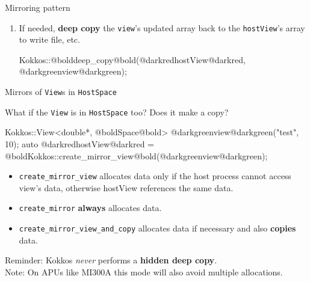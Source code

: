 \begin{frame}[fragile]{Mirroring pattern}
\begin{enumerate}
{  }
    \item<+->{If needed, \textbf{deep copy} the {\color{darkgreen}\texttt{view}}'s updated array back to the {\color{darkred}\texttt{hostView}}'s array to write file, etc. \\

      \vspace{-5pt}
      \begin{code}[keywords={}]
  Kokkos::@bolddeep_copy@bold(@darkredhostView@darkred, @darkgreenview@darkgreen);
      \end{code}
      \vspace{-4pt}

  }
  \end{enumerate}

\end{frame}


\begin{frame}[fragile]{Mirrors of \texttt{View}s in \texttt{HostSpace}}

  What if the \texttt{View} is in \texttt{HostSpace} too?  Does it make a copy?

  \begin{code}[keywords={}]
Kokkos::View<double*, @boldSpace@bold> @darkgreenview@darkgreen("test", 10);
auto @darkredhostView@darkred = @boldKokkos::create_mirror_view@bold(@darkgreenview@darkgreen);
  \end{code}

  \begin{itemize}
    \item{\texttt{create\_mirror\_view} allocates data only if the host process cannot access {\color{darkgreen}view}'s data, otherwise {\color{darkred}hostView} references the same data.}
    \item{\texttt{create\_mirror} \textbf{always} allocates data.}
    \item{\texttt{create\_mirror\_view\_and\_copy} allocates data if necessary and also \textbf{copies} data.}
  \end{itemize}

  Reminder: Kokkos \emph{never} performs a \textbf{hidden deep copy}.\\
  Note: On APUs like MI300A this mode will also avoid multiple allocations.

  \vspace{-5pt}

\end{frame}

